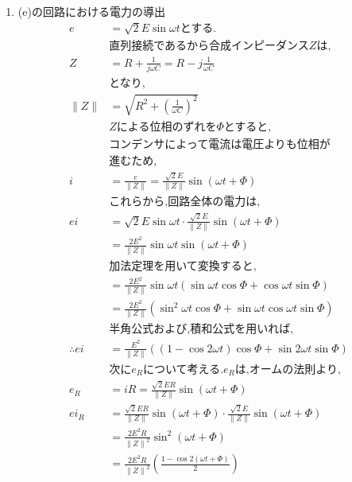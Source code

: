 \documentclass[twocolumn]{article}
\begin{document}
\begin{enumerate}
    \item (e)の回路における電力の導出
    \begin{align*}
      e &= \sqrt{2}E\sin\omega t \text{とする.}\\
      &\text{直列接続であるから合成インピーダンス}Z\text{は,}\\
      Z &= R + \frac{1}{j\omega C} = R -j\frac{1}{\omega C}\\
      &\text{となり,}\\
      \|Z\| &= \sqrt{R^2 + {\left( \frac{1}{\omega C} \right)}^2}\\
      &Z\text{による位相のずれを}\Phi\text{とすると,}\\
      &\text{コンデンサによって電流は電圧よりも位相が}\\
      &\text{進むため,}\\
      i &= \frac{e}{\|Z\|} = \frac{\sqrt{2}E}{\|Z\|}\sin\left(\omega t + \Phi\right)\\
      &\text{これらから,回路全体の電力は,}\\
      ei  &= \sqrt{2}E\sin\omega t \cdot \frac{\sqrt{2}E}{\|Z\|}\sin\left(\omega t + \Phi\right)\\
          &= \frac{2E^2}{\|Z\|}\sin\omega t\sin\left(\omega t + \Phi\right)\\
      &\text{加法定理を用いて変換すると,}\\
          &= \frac{2E^2}{\|Z\|}\sin\omega t\left(\sin\omega t \cos \Phi + \cos\omega t \sin \Phi\right)\\
          &= \frac{2E^2}{\|Z\|}\left(\sin^2\omega t \cos \Phi + \sin\omega t\cos\omega t \sin \Phi\right)\\
      &\text{半角公式および,積和公式を用いれば,}\\
\therefore ei  &= \frac{E^2}{\|Z\|}\left(\left(1-\cos2\omega t\right)\cos \Phi + \sin2\omega t \sin \Phi\right)\\
      &\text{次に}e_R\text{について考える.}e_R\text{は,オームの法則より,}\\
      e_R &= iR = \frac{\sqrt{2}ER}{\|Z\|}\sin\left(\omega t + \Phi\right)\\
      ei_R&= \frac{\sqrt{2}ER}{\|Z\|}\sin\left(\omega t + \Phi\right)\cdot \frac{\sqrt{2}E}{\|Z\|}\sin\left(\omega t + \Phi\right)\\
          &= \frac{2E^2R}{{\|Z\|}^2}\sin^2\left(\omega t + \Phi\right)\\
          &= \frac{2E^2R}{{\|Z\|}^2}\left(\frac{1 - \cos2\left(\omega t + \Phi\right)}{2}\right)\\

\end{align*}
\end{enumerate}
\end{document}
